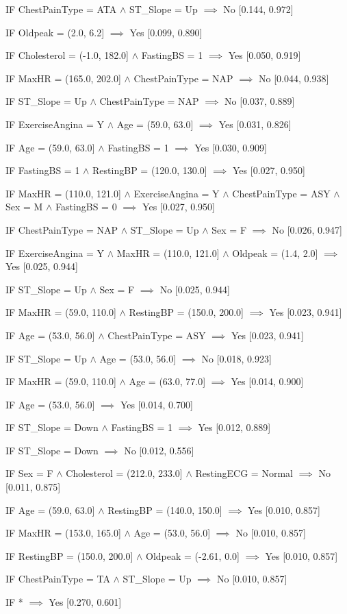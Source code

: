 IF ChestPainType = ATA $\land$ ST_Slope = Up $\implies$ No [0.144, 0.972]

IF Oldpeak = (2.0, 6.2] $\implies$ Yes [0.099, 0.890]

IF Cholesterol = (-1.0, 182.0] $\land$ FastingBS = 1 $\implies$ Yes [0.050, 0.919]

IF MaxHR = (165.0, 202.0] $\land$ ChestPainType = NAP $\implies$ No [0.044, 0.938]

IF ST_Slope = Up $\land$ ChestPainType = NAP $\implies$ No [0.037, 0.889]

IF ExerciseAngina = Y $\land$ Age = (59.0, 63.0] $\implies$ Yes [0.031, 0.826]

IF Age = (59.0, 63.0] $\land$ FastingBS = 1 $\implies$ Yes [0.030, 0.909]

IF FastingBS = 1 $\land$ RestingBP = (120.0, 130.0] $\implies$ Yes [0.027, 0.950]

IF MaxHR = (110.0, 121.0] $\land$ ExerciseAngina = Y $\land$ ChestPainType = ASY $\land$ Sex = M $\land$ FastingBS = 0 $\implies$ Yes [0.027, 0.950]

IF ChestPainType = NAP $\land$ ST_Slope = Up $\land$ Sex = F $\implies$ No [0.026, 0.947]

IF ExerciseAngina = Y $\land$ MaxHR = (110.0, 121.0] $\land$ Oldpeak = (1.4, 2.0] $\implies$ Yes [0.025, 0.944]

IF ST_Slope = Up $\land$ Sex = F $\implies$ No [0.025, 0.944]

IF MaxHR = (59.0, 110.0] $\land$ RestingBP = (150.0, 200.0] $\implies$ Yes [0.023, 0.941]

IF Age = (53.0, 56.0] $\land$ ChestPainType = ASY $\implies$ Yes [0.023, 0.941]

IF ST_Slope = Up $\land$ Age = (53.0, 56.0] $\implies$ No [0.018, 0.923]

IF MaxHR = (59.0, 110.0] $\land$ Age = (63.0, 77.0] $\implies$ Yes [0.014, 0.900]

IF Age = (53.0, 56.0] $\implies$ Yes [0.014, 0.700]

IF ST_Slope = Down $\land$ FastingBS = 1 $\implies$ Yes [0.012, 0.889]

IF ST_Slope = Down $\implies$ No [0.012, 0.556]

IF Sex = F $\land$ Cholesterol = (212.0, 233.0] $\land$ RestingECG = Normal $\implies$ No [0.011, 0.875]

IF Age = (59.0, 63.0] $\land$ RestingBP = (140.0, 150.0] $\implies$ Yes [0.010, 0.857]

IF MaxHR = (153.0, 165.0] $\land$ Age = (53.0, 56.0] $\implies$ No [0.010, 0.857]

IF RestingBP = (150.0, 200.0] $\land$ Oldpeak = (-2.61, 0.0] $\implies$ Yes [0.010, 0.857]

IF ChestPainType = TA $\land$ ST_Slope = Up $\implies$ No [0.010, 0.857]

IF * $\implies$ Yes [0.270, 0.601]
